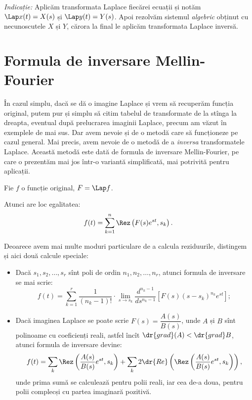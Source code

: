 \emph{Indicație:} Aplicăm transformata Laplace fiecărei ecuații
și notăm $ \Lap x(t) = X(s) $ și $ \Lap y(t) = Y(s) $. Apoi rezolvăm sistemul
\emph{algebric} obținut cu necunoscutele $ X $ și $ Y $, cărora la final le
aplicăm transformata Laplace inversă.

\section{Formula de inversare Mellin-Fourier}

În cazul simplu, dacă se dă o imagine Laplace și vrem să recuperăm funcția
original, putem pur și simplu să citim tabelul de transformate de la stînga
la dreapta, eventual după prelucrarea imaginii Laplace, precum am văzut în
exemplele de mai sus. Dar avem nevoie și de o metodă care să funcționeze 
pe cazul general. Mai precis, avem nevoie de o metodă de a \emph{inversa}
transformatele Laplace. Această metodă este dată de formula de inversare
Mellin-Fourier, pe care o prezentăm mai jos într-o variantă simplificată,
mai potrivită pentru aplicații.

\begin{theorem}\label{thm:mellin-fourier}
    Fie $ f $ o funcție original, $ F = \Lap f $.

    Atunci are loc egalitatea:
    \[
        f(t) = \sum_{k=1}^n \Rez\left(F(s)e^{st}, s_k\right).
    \]
\end{theorem}

Deoarece avem mai multe moduri particulare de a calcula reziduurile, distingem
și aici două calcule speciale:
\begin{itemize}
    \item Dacă $ s_1, s_2, \dots, s_r $ sînt poli de ordin $ n_1, n_2, \dots, n_r $, atunci
        formula de inversare se mai scrie:
        \[
            f(t) = \sum_{k=1}^r \dfrac{1}{(n_k - 1)!} \cdot %
            \lim_{s \to s_k} \dfrac{d^{n_k - 1}}{ds^{n_k - 1}} \left[ %
            F(s)(s - s_k)^{n_k} e^{st} \right];
        \]
    \item Dacă imaginea Laplace se poate scrie $ F(s) = \dfrac{A(s)}{B(s)} $,
        unde $ A $ și $ B $ sînt polinoame cu coeficienți reali, astfel încît
        $ \dr{grad}(A) < \dr{grad}B $, atunci formula de inversare devine:
        \[
            f(t) = \sum_k \Rez\left(\dfrac{A(s)}{B(s)}e^{st}, s_k\right) + %
            \sum_k 2 \dr{Re} \left( \Rez \left( \dfrac{A(s)}{B(s)}e^{st}, s_k \right) \right),
        \]
        unde prima sumă se calculează pentru polii reali, iar cea de-a doua, pentru
        polii complecși cu partea imaginară pozitivă.
\end{itemize}

